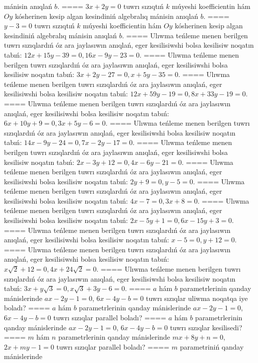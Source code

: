 mánisin anıqlań $b$.
====
$3x+2y=0$ tuwrı sızıqtıń $k$ múyeshi
koefficientin hám $Oy$ kósherinen kesip algan kesindiniń algebralıq
mánisin anıqlań $b$.
====
$y-3=0$ tuwrı sızıqtıń $k$ múyeshi
koefficientin hám $Oy$ kósherinen kesip algan kesindiniń algebralıq
mánisin anıqlań $b$.
====
Ulıwma teńleme menen berilgen tuwrı sızıqlardıń
óz ara jaylasıwın anıqlań, eger kesilisiwshi bolsa kesilisiw noqatın
tabıń: $12x+15y-39=0, 16x-9y-23=0$.
====
Ulıwma teńleme menen berilgen tuwrı sızıqlardıń
óz ara jaylasıwın anıqlań, eger kesilisiwshi bolsa kesilisiw noqatın
tabıń: $3x+2y-27=0, x+5y-35=0$.
====
Ulıwma teńleme menen berilgen tuwrı sızıqlardıń
óz ara jaylasıwın anıqlań, eger kesilisiwshi bolsa kesilisiw noqatın
tabıń: $12x+59y-19=0, 8x+33y-19=0$.
====
Ulıwma teńleme menen berilgen tuwrı sızıqlardıń
óz ara jaylasıwın anıqlań, eger kesilisiwshi bolsa kesilisiw noqatın
tabıń: $6x+10y+9=0, 3x+5y-6=0$.
====
Ulıwma teńleme menen berilgen tuwrı sızıqlardıń
óz ara jaylasıwın anıqlań, eger kesilisiwshi bolsa kesilisiw noqatın
tabıń: $14x-9y-24=0, 7x-2y-17=0$.
====
Ulıwma teńleme menen berilgen tuwrı sızıqlardıń
óz ara jaylasıwın anıqlań, eger kesilisiwshi bolsa kesilisiw noqatın
tabıń: $2x-3y+12=0, 4x-6y-21=0$.
====
Ulıwma teńleme menen berilgen tuwrı sızıqlardıń
óz ara jaylasıwın anıqlań, eger kesilisiwshi bolsa kesilisiw noqatın
tabıń: $2y+9=0, y-5=0$.
====
Ulıwma teńleme menen berilgen tuwrı sızıqlardıń
óz ara jaylasıwın anıqlań, eger kesilisiwshi bolsa kesilisiw noqatın
tabıń: $4x-7=0, 3x+8=0$.
====
Ulıwma teńleme menen berilgen tuwrı sızıqlardıń
óz ara jaylasıwın anıqlań, eger kesilisiwshi bolsa kesilisiw noqatın
tabıń: $2x-5y+1=0, 6x-15y+3=0$.
====
Ulıwma teńleme menen berilgen tuwrı sızıqlardıń
óz ara jaylasıwın anıqlań, eger kesilisiwshi bolsa kesilisiw noqatın
tabıń: $x-5=0, y+12=0$.
====
Ulıwma teńleme menen berilgen tuwrı sızıqlardıń
óz ara jaylasıwın anıqlań, eger kesilisiwshi bolsa kesilisiw noqatın
tabıń: $x\sqrt{2}+12=0, 4x+24\sqrt{2}=0$.
====
Ulıwma teńleme menen berilgen tuwrı sızıqlardıń
óz ara jaylasıwın anıqlań, eger kesilisiwshi bolsa kesilisiw noqatın
tabıń: $3x+y\sqrt{3}=0, x\sqrt{3}+3y-6=0$.
====
$a$ hám $b$ parametrlerinin qanday mánislerinde
$ax-2y-1=0$, $6x-4y-b=0$ tuwrı sızıqlar uliwma noqatqa iye boladı?
====
$a$ hám $b$ parametrlerinin qanday mánislerinde
$ax-2y-1=0$, $6x-4y-b=0$ tuwrı sızıqlar parallel boladı?
====
$a$ hám $b$ parametrlerinin qanday mánislerinde
$ax-2y-1=0$, $6x-4y-b=0$ tuwrı sızıqlar kesilisedi?
====
$m$ hám $n$ parametrlerinin qanday mánislerinde
$mx+8y+n=0$, $2x+my-1=0$ tuwrı sızıqlar parallel boladı?
====
$m$ parametriniń qanday mánislerinde
